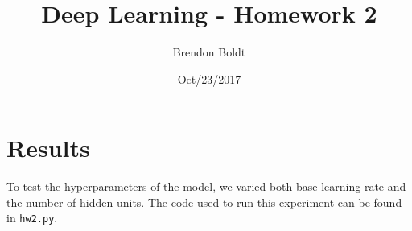 \documentclass[a4paper]{article}
\title{Deep Learning - Homework 2}
\author{Brendon Boldt}
\date{Oct/23/2017}
\begin{document}

\maketitle

%
\iffalse
\begin{lstlisting}
> python3 hw0.libraries.py
3.5.2 (default, Nov 17 2016, 17:05:23) 
[GCC 5.4.0 20160609]
1.13.1
0.19.1
0.19.0
2.0.2
0.20.3
1.3.0
\end{lstlisting}
\fi



\section{Results}

To test the hyperparameters of the model, we varied both base learning
rate and the number of hidden units. The code used to run this
experiment can be found in \texttt{hw2.py}.
\end{document}
